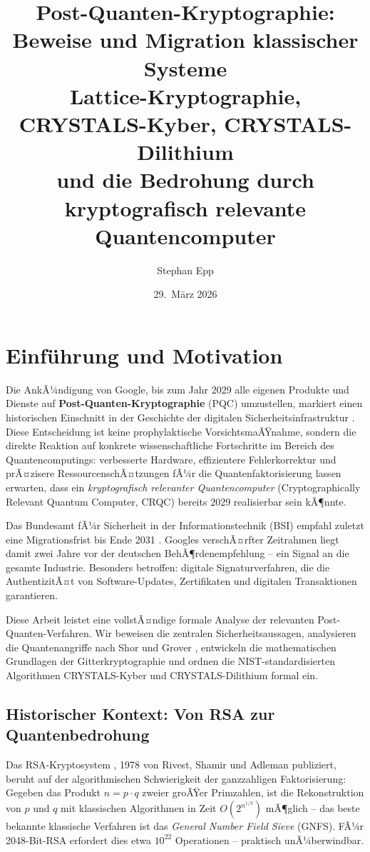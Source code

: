 ﻿\documentclass[a4paper,12pt]{article}
\title{\textbf{Post-Quanten-Kryptographie:\\
Beweise und Migration klassischer Systeme}\\[0.8ex]
\large Lattice-Kryptographie, CRYSTALS-Kyber, CRYSTALS-Dilithium\\
und die Bedrohung durch kryptografisch relevante Quantencomputer}
\author{Stephan Epp}
\date{29.\ M\"arz 2026}
\theoremstyle{definition}
\begin{document}
\maketitle
\tableofcontents
\newpage

\section{Einf\"uhrung und Motivation}

Die AnkÃ¼ndigung von Google, bis zum Jahr 2029 alle eigenen Produkte und Dienste auf
\textbf{Post-Quanten-Kryptographie} (PQC) umzustellen, markiert einen historischen
Einschnitt in der Geschichte der digitalen Sicherheitsinfrastruktur \cite{Goo26,Hei26}.
Diese Entscheidung ist keine prophylaktische VorsichtsmaÃŸnahme, sondern die direkte
Reaktion auf konkrete wissenschaftliche Fortschritte im Bereich des Quantencomputings:
verbesserte Hardware, effizientere Fehlerkorrektur und prÃ¤zisere RessourcenschÃ¤tzungen
fÃ¼r die Quantenfaktorisierung lassen erwarten, dass ein \emph{kryptografisch relevanter
Quantencomputer} (Cryptographically Relevant Quantum Computer, CRQC) bereits 2029
realisierbar sein kÃ¶nnte.

Das Bundesamt fÃ¼r Sicherheit in der Informationstechnik (BSI) empfahl zuletzt eine
Migrationsfrist bis Ende 2031 \cite{BSI24}. Googles verschÃ¤rfter Zeitrahmen liegt
damit zwei Jahre vor der deutschen BehÃ¶rdenempfehlung -- ein Signal an die gesamte
Industrie. Besonders betroffen: digitale Signaturverfahren, die die AuthentizitÃ¤t
von Software-Updates, Zertifikaten und digitalen Transaktionen garantieren.

Diese Arbeit leistet eine vollstÃ¤ndige formale Analyse der relevanten
Post-Quanten-Verfahren. Wir beweisen die zentralen Sicherheitsaussagen, analysieren
die Quantenangriffe nach Shor \cite{Sho94} und Grover \cite{Gro96}, entwickeln
die mathematischen Grundlagen der Gitterkryptographie \cite{Reg05,LPR10,MR09}
und ordnen die NIST-standardisierten Algorithmen CRYSTALS-Kyber \cite{ABD+22}
und CRYSTALS-Dilithium \cite{DKL+22} formal ein.

\subsection{Historischer Kontext: Von RSA zur Quantenbedrohung}

Das RSA-Kryptosystem \cite{Riv78}, 1978 von Rivest, Shamir und Adleman publiziert,
beruht auf der algorithmischen Schwierigkeit der ganzzahligen Faktorisierung:
Gegeben das Produkt $n = p \cdot q$ zweier groÃŸer Primzahlen, ist die Rekonstruktion
von $p$ und $q$ mit klassischen Algorithmen in Zeit $O(2^{n^{1/3}})$ mÃ¶glich --
das beste bekannte klassische Verfahren ist das \emph{General Number Field Sieve}
(GNFS). FÃ¼r 2048-Bit-RSA erfordert dies etwa $10^{22}$ Operationen -- praktisch
unÃ¼berwindbar.
\end{document}
